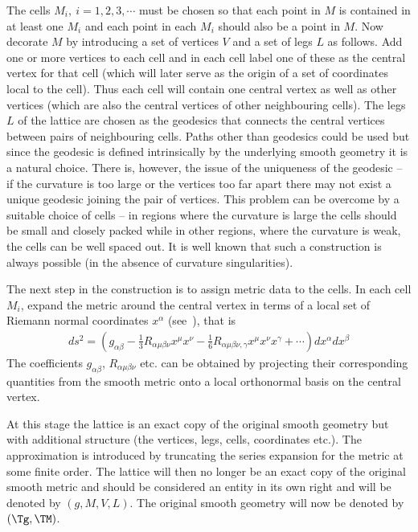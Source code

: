\documentclass[a4paper,12pt]{article}
\numberwithin{equation}{section}
\begin{document}
The cells $M_i,\>i=1,2,3,\cdots$ must be chosen so that each point in $M$ is contained in at
least one $M_i$ and each point in each $M_i$ should also be a point in $M$. Now decorate $M$
by introducing a set of vertices $V$ and a set of legs $L$ as follows. Add one or more
vertices to each cell and in each cell label one of these as the central vertex for that
cell (which will later serve as the origin of a set of coordinates local to the cell). Thus
each cell will contain one central vertex as well as other vertices (which are also the
central vertices of other neighbouring cells). The legs $L$ of the lattice are chosen as the
geodesics that connects the central vertices between pairs of neighbouring cells. Paths other
than geodesics could be used but since the geodesic is defined intrinsically by the
underlying smooth geometry it is a natural choice. There is, however, the issue of the
uniqueness of the geodesic -- if the curvature is too large or the vertices too far apart
there may not exist a unique geodesic joining the pair of vertices. This problem can be
overcome by a suitable choice of cells -- in regions where the curvature is large the cells
should be small and closely packed while in other regions, where the curvature is weak, the
cells can be well spaced out. It is well known that such a construction is always possible
(in the absence of curvature singularities).

The next step in the construction is to assign metric data to the cells. In each cell $M_i$,
expand the metric around the central vertex in terms of a local set of Riemann normal
coordinates $x^\alpha$ (see~\cite{willmore:1996-01,synge:1960-01,brewin:2009-03}), that is
\begin{align}
   \label{eqn:dsExact}
	ds^2 = \left (g_{\alpha\beta}
	              - \frac{1}{3} R_{\alpha\mu\beta\nu} x^\mu x^\nu
                 - \frac{1}{6} R_{\alpha\mu\beta\nu,\gamma} x^\mu x^\nu x^\gamma
					  + \cdots
			 \right) dx^\alpha dx^\beta
\end{align}
The coefficients $g_{\alpha\beta}$, $R_{\alpha\mu\beta\nu}$ etc. can be obtained by
projecting their corresponding quantities from the smooth metric onto a local orthonormal
basis on the central vertex.

At this stage the lattice is an exact copy of the original smooth geometry but with
additional structure (the vertices, legs, cells, coordinates etc.). The approximation is
introduced by truncating the series expansion for the metric at some finite order. The
lattice will then no longer be an exact copy of the original smooth metric and should be
considered an entity in its own right and will be denoted by $(g,M,V,L)$. The original
smooth geometry will now be denoted by $(\Tg,\TM)$.
\end{document}
